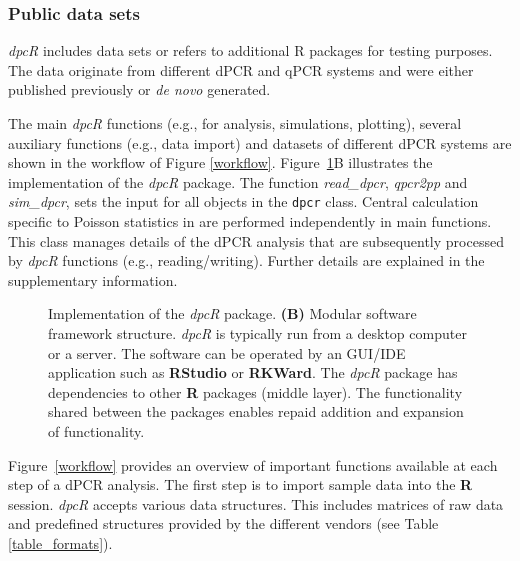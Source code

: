 \documentclass[a4,center,fleqn]{NAR}
\begin{document}
\subsubsection{Public data sets}

\textit{dpcR} includes data sets or refers to additional R packages for testing 
purposes. The data originate from different dPCR and qPCR systems and were 
either published previously \cite{whale_comparison_2012, roediger2015chippcr, 
white_digital_2009, rodiger_r_2015, dorazio_statistical_2015} or \textit{de 
novo} generated.



The main \textit{dpcR} functions (e.g., for analysis, 
simulations, plotting), several auxiliary functions (e.g., data import) and 
datasets of different dPCR systems are shown in the workflow of Figure 
\ref{workflow}. Figure~\ref{dpcR_framework}B illustrates the implementation of 
the \textit{dpcR} package. The function \textit{read\_dpcr}, \textit{qpcr2pp} 
and \textit{sim\_dpcr}, sets the input for all objects in the \texttt{dpcr} 
class. Central calculation specific to Poisson statistics in are performed 
independently in main functions. This class manages details of the dPCR analysis 
that are subsequently processed by \textit{dpcR} functions (e.g., 
reading/writing). Further details are explained in the supplementary 
information.

\begin{figure}[t]
\begin{center}
\end{center}
\caption{Implementation of the \textit{dpcR} package. \textbf{(B)} Modular 
software framework structure. \textit{dpcR} is typically run from a desktop 
computer or a server. The software can be operated by an GUI/IDE application 
such as \textbf{RStudio} or \textbf{RKWard}. The \textit{dpcR} package has 
dependencies to other \textbf{R} packages (middle layer). The functionality 
shared between the packages enables repaid addition and expansion of 
functionality.}
\label{dpcR_framework}
\end{figure}



Figure~\ref{workflow} provides an overview of important functions available at 
each step of a dPCR analysis. The first step is to import sample data into the 
\textbf{R} session. \textit{dpcR} accepts various data structures. This 
includes 
matrices of raw data and predefined structures provided by the different 
vendors 
(see Table \ref{table_formats}). 
\end{document}
